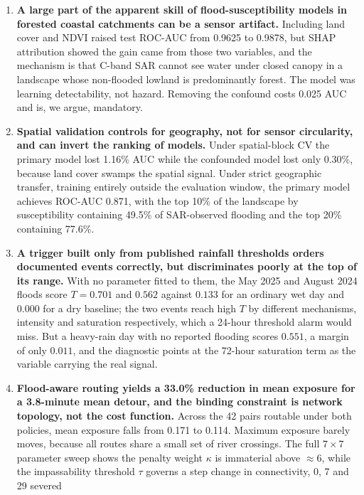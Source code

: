 \documentclass[10pt,twocolumn]{article}
\begin{document}
\begin{enumerate}
\itemsep3pt
\item \textbf{A large part of the apparent skill of flood-susceptibility models
      in forested coastal catchments can be a sensor artifact.} Including land
      cover and NDVI raised test ROC-AUC from 0.9625 to 0.9878, but SHAP
      attribution showed the gain came from those two variables, and the
      mechanism is that C-band SAR cannot see water under closed canopy in a
      landscape whose non-flooded lowland is predominantly forest. The model was
      learning detectability, not hazard. Removing the confound costs 0.025 AUC
      and is, we argue, mandatory.
\item \textbf{Spatial validation controls for geography, not for sensor
      circularity, and can invert the ranking of models.} Under spatial-block CV
      the primary model lost 1.16\% AUC while the confounded model lost only
      0.30\%, because land cover swamps the spatial signal. Under strict
      geographic transfer, training entirely outside the evaluation window, the
      primary model achieves ROC-AUC 0.871, with the top 10\% of the landscape by
      susceptibility containing 49.5\% of SAR-observed flooding and the top 20\%
      containing 77.6\%.
\item \textbf{A trigger built only from published rainfall thresholds orders
      documented events correctly, but discriminates poorly at the top of its
      range.} With no parameter fitted to them, the May 2025 and August 2024
      floods score $T=0.701$ and $0.562$ against $0.133$ for an ordinary wet day
      and $0.000$ for a dry baseline; the two events reach high $T$ by different
      mechanisms, intensity and saturation respectively, which a 24-hour
      threshold alarm would miss. But a heavy-rain day with no reported flooding
      scores $0.551$, a margin of only $0.011$, and the diagnostic points at the
      72-hour saturation term as the variable carrying the real signal.
\item \textbf{Flood-aware routing yields a 33.0\% reduction in mean exposure for a
      3.8-minute mean detour, and the binding constraint is network topology, not
      the cost function.} Across the 42 pairs routable under both policies,
      mean exposure falls from 0.171 to 0.114. Maximum exposure barely moves, because all routes share a small set
      of river crossings. The full $7\times7$ parameter sweep shows the penalty
      weight $\kappa$ is immaterial above $\approx6$, while the impassability
      threshold $\tau$ governs a step change in connectivity, 0, 7 and 29 severed

\end{enumerate}
\end{document}
